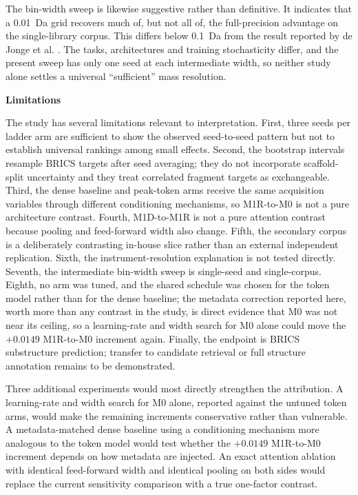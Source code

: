 \documentclass[11pt]{article}
\newcommand{\hd}[1]{\medskip\par\noindent\textbf{#1}\par\nobreak\vspace{2pt}\noindent\ignorespaces}
\begin{document}
The bin-width sweep is likewise suggestive rather than definitive. It indicates that a 0.01~Da grid recovers much of, but not all of, the full-precision advantage on the single-library corpus. This differs below 0.1~Da from the result reported by de Jonge et al. \cite{dejonge2026cross}. The tasks, architectures and training stochasticity differ, and the present sweep has only one seed at each intermediate width, so neither study alone settles a universal ``sufficient'' mass resolution.

\hd{Limitations}
The study has several limitations relevant to interpretation. First, three seeds per ladder arm are sufficient to show the observed seed-to-seed pattern but not to establish universal rankings among small effects. Second, the bootstrap intervals resample BRICS targets after seed averaging; they do not incorporate scaffold-split uncertainty and they treat correlated fragment targets as exchangeable. Third, the dense baseline and peak-token arms receive the same acquisition variables through different conditioning mechanisms, so M1R-to-M0 is not a pure architecture contrast. Fourth, M1D-to-M1R is not a pure attention contrast because pooling and feed-forward width also change. Fifth, the secondary corpus is a deliberately contrasting in-house slice rather than an external independent replication. Sixth, the instrument-resolution explanation is not tested directly. Seventh, the intermediate bin-width sweep is single-seed and single-corpus. Eighth, no arm was tuned, and the shared schedule was chosen for the token model rather than for the dense baseline; the metadata correction reported here, worth more than any contrast in the study, is direct evidence that M0 was not near its ceiling, so a learning-rate and width search for M0 alone could move the $+0.0149$ M1R-to-M0 increment again. Finally, the endpoint is BRICS substructure prediction; transfer to candidate retrieval or full structure annotation remains to be demonstrated.

Three additional experiments would most directly strengthen the attribution. A learning-rate and width search for M0 alone, reported against the untuned token arms, would make the remaining increments conservative rather than vulnerable. A metadata-matched dense baseline using a conditioning mechanism more analogous to the token model would test whether the $+0.0149$ M1R-to-M0 increment depends on how metadata are injected. An exact attention ablation with identical feed-forward width and identical pooling on both sides would replace the current sensitivity comparison with a true one-factor contrast.
\end{document}

